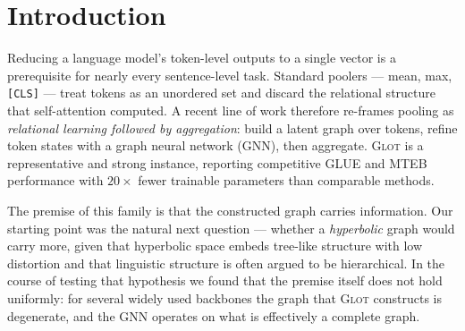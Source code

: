 \documentclass{article} %
\begin{document}
\begin{abstract}
backbone, task and search budget we measured, deleting the token graph is
indistinguishable from --- and on CoLA better than --- the full method, despite
well-conditioned graph density, so the constructed graph carries no measurable
information.
We further show that the published \textsc{Glot} numbers are single-seed maxima
over a hyperparameter grid: at the authors' own seed and grid we exceed their
reported CoLA by $3.03$ MCC and their RTE by $0.36$, and their reported
$\tau$-sensitivity curve spans a range ($7.87$ on CoLA) comparable to the
variation we measure across seeds at \emph{fixed} $\tau$ ($5.46$).
Along the way we document two measurement artifacts that we believe affect the
wider literature: $\delta$-hyperbolicity computed on raw LLM activations is
dominated by attention-sink norm outliers rather than linguistic structure, and
tuning-stage maxima in this setting are inflated by up to $1.83$ points by
selection bias alone.
\end{abstract}

\section{Introduction}
\label{sec:intro}

Reducing a language model's token-level outputs to a single vector is a
prerequisite for nearly every sentence-level task. Standard poolers --- mean,
max, \texttt{[CLS]} --- treat tokens as an unordered set and discard the
relational structure that self-attention computed. A recent line of work
therefore re-frames pooling as \emph{relational learning followed by
aggregation}: build a latent graph over tokens, refine token states with a
graph neural network (GNN), then aggregate. \textsc{Glot}
\citep{mantri2026glot} is a representative and strong instance, reporting
competitive GLUE and MTEB performance with $20\times$ fewer trainable
parameters than comparable methods.

The premise of this family is that the constructed graph carries information.
Our starting point was the natural next question --- whether a \emph{hyperbolic}
graph would carry more, given that hyperbolic space embeds tree-like structure
with low distortion and that linguistic structure is often argued to be
hierarchical. In the course of testing that hypothesis we found that the
premise itself does not hold uniformly: for several widely used backbones the
graph that \textsc{Glot} constructs is degenerate, and the GNN operates on what
is effectively a complete graph.
\end{document}
